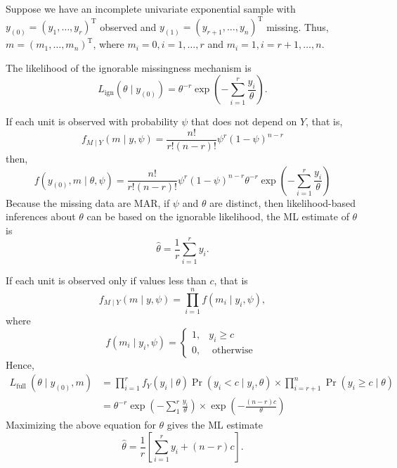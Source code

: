 \begin{example}
	Suppose we have an incomplete univariate exponential sample with $y_{(0)}=\left(y_{1},\ldots,y_{r}\right)^{\mathrm{T}}$ observed and $y_{(1)}=\left(y_{r+1},\ldots,y_{n}\right)^{\mathrm{T}}$ missing. Thus, $m=\left(m_{1},\ldots,m_{n}\right)^{\mathrm{T}}$, where $m_{i}=0,i=1,\ldots,r$ and $m_{i}=1,i=r+1,\ldots,n$.

	The likelihood of the ignorable missingness mechanism is
	\begin{equation}
		L_{\mathrm{ign}}\left(\theta\mid y_{(0)}\right)=\theta^{-r}\exp\left(-\sum_{i=1}^{r}\frac{y_{i}}{\theta}\right).
	\end{equation}

	If each unit is observed with probability $\psi$ that does not depend on $Y$, that is,
	\begin{equation}
		f_{M\mid Y}(m\mid y,\psi)=\frac{n!}{r!(n-r)!}\psi^{r}(1-\psi)^{n-r}
	\end{equation}
	then,
	\begin{equation}
		f\left(y_{(0)},m\mid\theta,\psi\right)=\frac{n!}{r!(n-r)!}\psi^{r}(1-\psi)^{n-r}\theta^{-r}\exp\left(-\sum_{i=1}^{r}\frac{y_{i}}{\theta}\right)
	\end{equation}
	Because the missing data are MAR, if $\psi$ and $\theta$ are distinct, then likelihood-based
	inferences about $\theta$ can be based on the ignorable likelihood, the ML estimate of $\theta$ is
	\begin{equation}
		\hat{\theta}=\frac{1}{r}\sum_{i=1}^{r}y_{i}.
	\end{equation}

	If each unit is observed only if values less than $c$, that is
	\begin{equation}
		f_{M\mid Y}(m\mid y,\psi)=\prod_{i=1}^{n}f\left(m_{i}\mid y_{i},\psi\right),
	\end{equation}
	where
	\begin{equation}
		f\left(m_{i} \mid y_{i}, \psi\right)=\left\{\begin{array}{ll}
			1, & y_{i}\geq c        \\
			0, & \text{ otherwise }
		\end{array}\right.
	\end{equation}
	Hence,
	\begin{equation}
		\begin{aligned}
			L_{\text {full }}\left(\theta \mid y_{(0)}, m\right) & =\prod_{i=1}^{r} f_{Y}\left(y_{i} \mid \theta\right) \operatorname{Pr}\left(y_{i}<c \mid y_{i}, \theta\right) \times \prod_{i=r+1}^{n} \operatorname{Pr}\left(y_{i} \geq c \mid \theta\right) \\
			                                                     & =\theta^{-r} \exp \left(-\sum_{1}^{r} \frac{y_{i}}{\theta}\right) \times \exp \left(-\frac{(n-r) c}{\theta}\right)
		\end{aligned}
	\end{equation}
	Maximizing the above equation for $\theta$ gives the ML estimate
	\begin{equation}
		\hat{\theta}=\frac{1}{r}\left[\sum_{i=1}^{r}y_{i}+(n-r)c\right].
	\end{equation}


\end{example}
